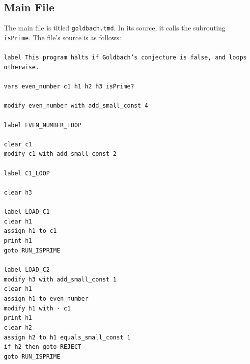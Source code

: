 \documentclass[11pt]{report}
\begin{document}
\subsection{Main File}

The main file is titled \texttt{goldbach.tmd}. In its source, it calls the subrouting \texttt{isPrime}. The file's source is as follows: \\ \\
{\tt label This program halts if Goldbach's conjecture is false, and loops otherwise. \\ \\
vars even\_number c1 h1 h2 h3 isPrime? \\ \\
modify even\_number with add\_small\_const 4 \\ \\
label EVEN\_NUMBER\_LOOP \\ \\ 
\indent	clear c1 \\ 
\indent	modify c1 with add\_small\_const 2 \\ \\
\indent	label C1\_LOOP \\ \\
\indent \indent	clear h3 \\ \\		
\indent \indent	label LOAD\_C1 \\
\indent \indent	clear h1 \\
\indent \indent	assign h1 to c1 \\
\indent \indent print h1 \\
\indent \indent	goto RUN\_ISPRIME \\ \\
\indent \indent	label LOAD\_C2 \\
\indent \indent	modify h3 with add\_small\_const 1 \\
\indent \indent	clear h1 \\
\indent \indent	assign h1 to even\_number \\
\indent \indent	modify h1 with - c1 \\
\indent \indent	print h1 \\
\indent \indent	clear h2 \\
\indent \indent	assign h2 to h1 equals\_small\_const 1 \\
\indent \indent	if h2 then goto REJECT \\
\indent \indent	goto RUN\_ISPRIME \\ \\
}
\end{document}
